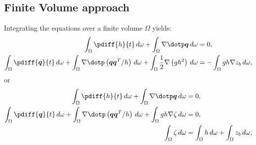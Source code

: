 \subsection*{Finite Volume approach}
Integrating the equations over a finite volume $\Omega$ yields:
\begin{subequations}
    \begin{align}
        \int_\Omega \pdiff{h}{t}\, d\omega
        + \int_\Omega \nabla \dotp \vec{q}\, d\omega & = 0,
        \\
        \int_\Omega \pdiff{\vec{q}}{t}\, d\omega
        + \int_\Omega \nabla \dotp \left( \vec{q}\vec{q}^T/h\right)\, d\omega
        + \int_\Omega \half  \nabla \left( g h^2 \right) \, d\omega & =
        - \int_\Omega gh\nabla z_b\, d\omega,
    \end{align}
    \label{eq:pressure_dependent_on_h}
\end{subequations}
or
\begin{subequations}
\begin{align}
    \int_\Omega \pdiff{h}{t}\, d\omega + \int_\Omega \nabla \dotp \vec{q}\, d\omega & = 0,
    \\
    \int_\Omega \pdiff{\vec{q}}{t}\, d\omega
    + \int_\Omega \nabla \dotp \left( \vec{q}\vec{q}^T/h\right)\, d\omega
    + \int_\Omega gh \nabla \zeta\, d\omega & = 0,
    \\
    \int_\Omega \zeta\, d\omega & = \int_\Omega h\, d\omega + \int_\Omega z_b\, d\omega,
\end{align}
\label{eq:pressure_dependent_on_zeta}
\end{subequations}

